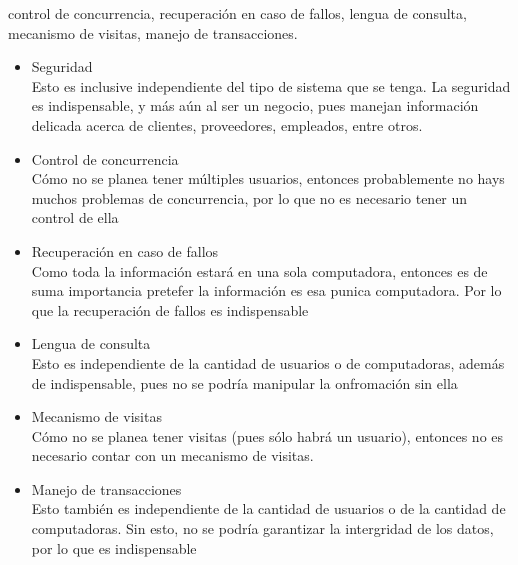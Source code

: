 \documentclass{article}
\begin{document}
\begin{enumerate}[label=\alph*.]
{{            control de concurrencia, recuperación en caso de fallos, lengua de 
            consulta, mecanismo de visitas, manejo de transacciones}.
            \begin{itemize}
                \item {Seguridad \\
                Esto es inclusive independiente del tipo de sistema que se 
                tenga. La seguridad es indispensable, y más aún al ser un 
                negocio, pues manejan información delicada acerca de clientes,
                proveedores, empleados, entre otros.}
                \item {Control de concurrencia \\
                Cómo no se planea tener múltiples usuarios, entonces probablemente
                no hays muchos problemas de concurrencia, por lo que no es 
                necesario tener un control de ella}
                \item {Recuperación en caso de fallos \\
                Como toda la información estará en una sola computadora, 
                entonces es de suma importancia pretefer la información es esa 
                punica computadora. Por lo que la recuperación de fallos es 
                indispensable}
                \item {Lengua de consulta \\
                Esto es independiente de la cantidad de usuarios o de 
                computadoras, además de indispensable, pues no se podría 
                manipular la onfromación sin ella}
                \item {Mecanismo de visitas \\
                Cómo no se planea tener visitas (pues sólo habrá un usuario), 
                entonces no es necesario contar con un mecanismo de visitas.
                }
                \item {Manejo de transacciones \\
                Esto también es independiente de la cantidad de usuarios o de la
                cantidad de computadoras. Sin esto, no se podría garantizar la 
                intergridad de los datos, por lo que es indispensable}
            \end{itemize}
        }
    \end{enumerate}
\end{document}

